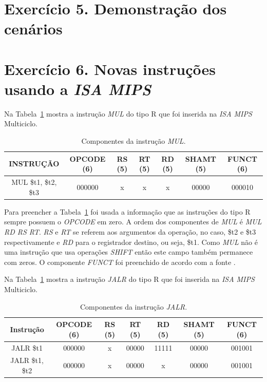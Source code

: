 \documentclass[12pt]{article}
\begin{document}
\section{Exercício 5. Demonstração dos cenários}
\label{sec:cenarios}

  
\section{Exercício 6. Novas instruções usando a \textit{ISA MIPS}}
\label{sec:isamips}

Na Tabela~\ref{tab:mul} mostra a instrução \textit{MUL} do tipo R que foi inserida na \textit{ISA MIPS} Multiciclo.

\begin{table}[H]
	\centering
	\begin{tabular}{|c|c|c|c|c|c|c|}
		\hline
		INSTRUÇÃO & OPCODE (6) & RS (5) & RT (5) & RD (5) & SHAMT (5) & FUNCT (6) \\\hline
		MUL \$t1, \$t2, \$t3 & 000000 & x & x & x & 00000 & 000010 \\\hline
	\end{tabular}
	\caption{Componentes da instrução \textit{MUL}.}
	\label{tab:mul}
\end{table}

Para preencher a Tabela~\ref{tab:mul} foi usada a informação que as instruções do tipo R sempre possuem o \textit{OPCODE} em zero. A ordem dos componentes de \textit{MUL} é \textit{MUL RD RS RT}. \textit{RS} e \textit{RT} se referem aos argumentos da operação, no caso, \$t2 e \$t3 respectivamente e \textit{RD} para o registrador destino, ou seja, \$t1. Como \textit{MUL} não é uma instrução que usa operações \textit{SHIFT} então este campo também permanece com zeros. O componente \textit{FUNCT} foi preenchido de acordo com a fonte \cite{mips32}.

Na Tabela~\ref{tab:mul} mostra a instrução \textit{JALR} do tipo R que foi inserida na \textit{ISA MIPS} Multiciclo.

\begin{table}[H]
	\centering
	\begin{tabular}{|c|c|c|c|c|c|c|}
		\hline
		Instrução & OPCODE (6) & RS (5) & RT (5) & RD (5) & SHAMT (5) & FUNCT (6) \\\hline
		JALR \$t1 & 000000 & x & 00000 & 11111 & 00000 & 001001 \\\hline
		JALR \$t1, \$t2 & 000000 & x & 00000 & x & 00000 & 001001 \\\hline
	\end{tabular}
	\caption{Componentes da instrução \textit{JALR}.}
	\label{tab:jalr}
\end{table}
\end{document}
